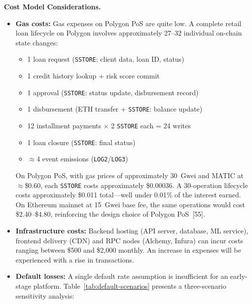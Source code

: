 \documentclass[12pt,a4paper]{report}
\begin{document}
\vspace{6pt}
\noindent\textbf{Cost Model Considerations.}

\begin{itemize}[noitemsep]
\item \textbf{Gas costs:} Gas expenses on Polygon PoS are quite low. A complete retail loan lifecycle on Polygon involves approximately 27--32 individual on-chain state changes:
\label{sec:gas-cost}
\begin{itemize}[noitemsep]
  \item 1 loan request (\texttt{SSTORE}: client data, loan ID, status)
  \item 1 credit history lookup + risk score commit
  \item 1 approval (\texttt{SSTORE}: status update, disbursement record)
  \item 1 disbursement (ETH transfer + \texttt{SSTORE}: balance update)
  \item 12 installment payments $\times$ 2 \texttt{SSTORE} each = 24 writes
  \item 1 loan closure (\texttt{SSTORE}: final status)
  \item $\approx$4 event emissions (\texttt{LOG2}/\texttt{LOG3})
\end{itemize}
On Polygon PoS, with gas prices of approximately 30~Gwei and MATIC at $\approx$\$0.60, each \texttt{SSTORE} costs approximately \$0.00036. A 30-operation lifecycle costs approximately \$0.011 total---well under 0.01\% of the interest earned. On Ethereum mainnet at 15~Gwei base fee, the same operations would cost \$2.40--\$4.80, reinforcing the design choice of Polygon PoS~[55].
\item \textbf{Infrastructure costs:} Backend hosting (API server, database, ML service), frontend delivery (CDN) and RPC nodes (Alchemy, Infura) can incur costs ranging between \$500 and \$2,000 monthly. An increase in expenses will be experienced with a rise in transactions.
\item \textbf{Default losses:} A single default rate assumption is insufficient for an early-stage platform. Table~\ref{tab:default-scenarios} presents a three-scenario sensitivity analysis:


\end{itemize}
\end{document}
